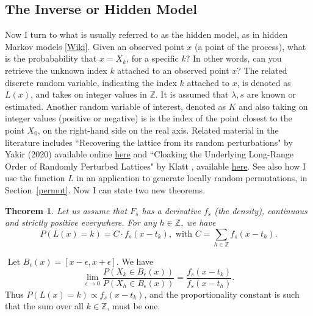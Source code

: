 \documentclass[10pt]{article}
\newtheorem{theorem}{Theorem}[section]
\newenvironment{proof}[1][Proof]{\begin{trivlist}
\item[\hskip \labelsep {\bfseries #1}]}{\end{trivlist}}
\newcommand{\qed}{\nobreak \ifvmode \relax \else
      \ifdim\lastskip<1.5em \hskip-\lastskip
      \hskip1.5em plus0em minus0.5em \fi \nobreak
      \vrule height0.75em width0.5em depth0.25em\fi}
\begin{document}
\subsection{The Inverse or Hidden Model}\label{hm} 

Now I turn to what is usually referred to as the \textcolor{index}{hidden model},  as in hidden Markov models [\href{https://en.wikipedia.org/wiki/Hidden_Markov_model}{Wiki}]. Given an observed point $x$ (a point of the process), what is the probabability that $x=X_k$, for a specific $k$? In other words, can you retrieve the unknown \textcolor{index}{index} $k$ attached to an observed point $x$? The related discrete random variable, indicating the \textcolor{index}{index} $k$ attached to $x$, is denoted as $L(x)$, and takes on integer values in $\mathbb{Z}$. It is assumed that $\lambda,s$ are known or estimated. Another random variable of interest, denoted as $K$ and also taking on integer values (positive or negative) is is the index of the point closest to the point $X_0$, on the right-hand side on the real axis. Related material in the 
literature includes ``Recovering the lattice from its random perturbations" by Yakir \cite{oren} (2020) available online
\href{https://arxiv.org/abs/2002.01508v2}{here} and 
``Cloaking the Underlying Long-Range Order of Randomly Perturbed Lattices" by Klatt \cite{glattip}, available
 \href{https://arxiv.org/abs/2001.08161}{here}. See also how I use the function $L$ in an application to generate locally random permutations, in Section~\ref{permut}. Now I can state two new theorems. 

\begin{theorem}
\label{sums4}
Let us assume that $F_s$ has a derivative $f_s$ (the density), continuous and strictly positive everywhere. For any $h\in\mathbb{Z}$, we have
$$
P(L(x)=k) =C\cdot f_s(x-t_k), \mbox{ with } C=\sum_{h\in\mathbb{Z}} f_s(x-t_h).$$
 \end{theorem}
\begin{proof}
$ $ \newline 
Let $B_\epsilon(x)=[x-\epsilon,x+\epsilon]$. We have
\begin{equation} 
\lim_{\epsilon\rightarrow 0}\frac{P(X_k\in B_\epsilon(x))}{P(X_h\in B_\epsilon(x))} = \frac{f_s(x-t_k)}{f_s(x-t_h)}.\nonumber
\end{equation}
Thus $P(L(x)=k)\propto  f_s(x-t_k)$, and the proportionality constant is such that the sum over all $k\in\mathbb{Z}$, must be one. 
\qed
\end{proof}
\end{document}
